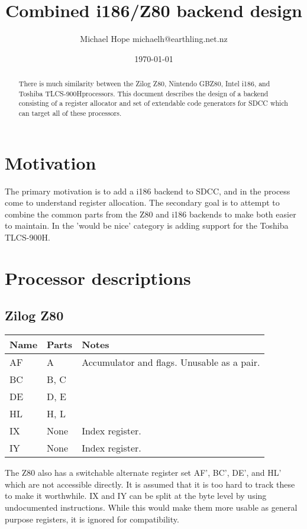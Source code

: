 \documentclass{article}
\newcommand{\tosh}{Toshiba TLCS-900H}
\begin{document}
\title{Combined i186/Z80 backend design}
\author{Michael Hope michaelh@earthling.net.nz}
\date{\today}
\maketitle

\begin{abstract}
There is much similarity between the Zilog Z80, Nintendo GBZ80, Intel
i186, and \tosh processors.  This document describes the design of a
backend consisting of a register allocator and set of extendable code
generators for SDCC which can target all of these processors.
\end{abstract}

\section{Motivation}
The primary motivation is to add a i186 backend to SDCC, and in the
process come to understand register allocation.  The secondary goal is
to attempt to combine the common parts from the Z80 and i186 backends
to make both easier to maintain.  In the 'would be nice' category is
adding support for the \tosh.

\section{Processor descriptions}

\subsection{Zilog Z80}
\begin{tabular}{l|l|l}
	Name	& Parts	& Notes \\ \hline
	AF	& A	& Accumulator and flags.  Unusable as a pair. \\ \hline
	BC	& B, C	& \\ \hline
	DE	& D, E	& \\ \hline
	HL	& H, L	& \\ \hline
	IX	& None	& Index register. \\ \hline
	IY	& None	& Index register. \\
\end{tabular}

The Z80 also has a switchable alternate register set AF', BC', DE',
and HL' which are not accessible directly.  It is assumed that it is
too hard to track these to make it worthwhile.  IX and IY can be split
at the byte level by using undocumented instructions.  While this
would make them more usable as general purpose registers, it is
ignored for compatibility.
\end{document}
